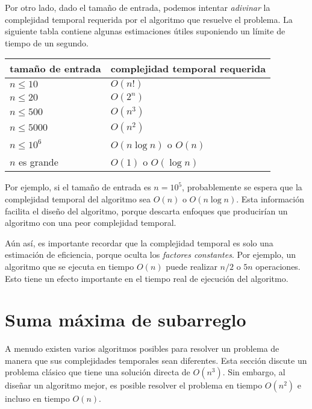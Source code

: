 Por otro lado, dado el tamaño de entrada,
podemos intentar \emph{adivinar}
la complejidad temporal requerida por el algoritmo
que resuelve el problema.
La siguiente tabla contiene algunas estimaciones útiles
suponiendo un límite de tiempo de un segundo.

\begin{center}
\begin{tabular}{ll}
tamaño de entrada & complejidad temporal requerida \\
\hline
$n \le 10$ & $O(n!)$ \\
$n \le 20$ & $O(2^n)$ \\
$n \le 500$ & $O(n^3)$ \\
$n \le 5000$ & $O(n^2)$ \\
$n \le 10^6$ & $O(n \log n)$ o $O(n)$ \\
$n$ es grande & $O(1)$ o $O(\log n)$ \\
\end{tabular}
\end{center}

Por ejemplo, si el tamaño de entrada es $n=10^5$,
probablemente se espera que la complejidad temporal
del algoritmo sea $O(n)$ o $O(n \log n)$.
Esta información facilita el diseño del algoritmo,
porque descarta enfoques que producirían
un algoritmo con una peor complejidad temporal.


Aún así, es importante recordar que la
complejidad temporal es solo una estimación de eficiencia,
porque oculta los \emph{factores constantes}.
Por ejemplo, un algoritmo que se ejecuta en tiempo $O(n)$
puede realizar $n/2$ o $5n$ operaciones.
Esto tiene un efecto importante en el tiempo real
de ejecución del algoritmo.

\section{Suma máxima de subarreglo}


A menudo existen varios algoritmos posibles
para resolver un problema de manera que sus
complejidades temporales sean diferentes.
Esta sección discute un problema clásico que
tiene una solución directa de $O(n^3)$.
Sin embargo, al diseñar un algoritmo mejor,
es posible resolver el problema en tiempo $O(n^2)$
e incluso en tiempo $O(n)$.

